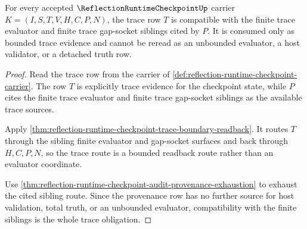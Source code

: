 \begin{theorem}
\label{thm:reflection-runtime-checkpoint-bounded-trace-gap-socket-compatibility}
For every accepted $\ReflectionRuntimeCheckpointUp$ carrier $K=(I,S,T,V,H,C,P,N)$, the trace row $T$ is compatible with the finite trace evaluator and finite trace gap-socket siblings cited by $P$. It is consumed only as bounded trace evidence and cannot be reread as an unbounded evaluator, a host validator, or a detached truth row.
\end{theorem}
\begin{proof}
Read the trace row from the carrier of \autoref{def:reflection-runtime-checkpoint-carrier}. The row $T$ is explicitly trace evidence for the checkpoint state, while $P$ cites the finite trace evaluator and finite trace gap-socket siblings as the available trace sources.

Apply \autoref{thm:reflection-runtime-checkpoint-trace-boundary-readback}. It routes $T$ through the sibling finite evaluator and gap-socket surfaces and back through $H,C,P,N$, so the trace route is a bounded readback route rather than an evaluator coordinate.

Use \autoref{thm:reflection-runtime-checkpoint-audit-provenance-exhaustion} to exhaust the cited sibling route. Since the provenance row has no further source for host validation, total truth, or an unbounded evaluator, compatibility with the finite siblings is the whole trace obligation.
\end{proof}

